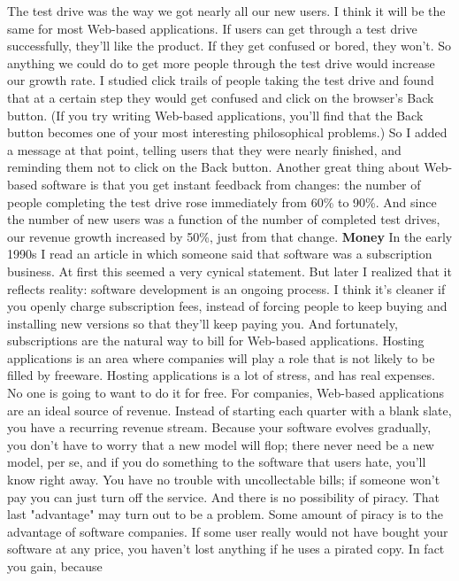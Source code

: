 The test drive was the way we got nearly all our new users.  I
think it will be the same for most Web-based applications.   If
users can get through a test drive successfully, they'll like the
product.  If they get confused or bored, they won't.  So anything
we could do to get more people through the test drive would increase
our growth rate.
I studied click trails of people taking the test drive and found
that at a certain step they would get confused and click on the
browser's Back button.  (If you try writing Web-based applications,
you'll find that the Back button becomes one of your most interesting
philosophical problems.) So I added a message at that point, telling
users that they were nearly finished, and reminding them not to
click on the Back button.  Another great thing about Web-based
software is that you get instant feedback from changes:  the number
of people completing the test drive rose immediately from 60\% to
90\%.  And since the number of new users was a function of the number
of completed test drives, our revenue growth increased by 50\%, just
from that change.
\textbf{Money}
In the early 1990s I read an article in which someone said that
software was a subscription business.  At first this seemed a very
cynical statement.  But later I realized that it reflects reality:
software development is an ongoing process.  I think it's cleaner
if you openly charge subscription fees, instead of forcing people
to keep buying and installing new versions so that they'll keep
paying you.  And fortunately, subscriptions are the natural way to
bill for Web-based applications.
Hosting applications is an area where companies will play a role
that is not likely to be filled by freeware.  Hosting applications
is a lot of stress, and has real expenses.  No one is going to want
to do it for free.
For companies, Web-based applications are an ideal source of revenue.
Instead of starting each quarter with a blank slate, you have a
recurring revenue stream.  Because your software evolves gradually,
you don't have to worry that a new model will flop; there never
need be a new model, per se, and if you do something to the software
that users hate, you'll know right away.  You have no trouble with
uncollectable bills; if someone won't pay you can just turn off
the service.  And there is no possibility of piracy.
That last "advantage" may turn out to be a problem.  Some amount
of piracy is to the advantage of software companies.  If some user
really would not have bought your software at any price, you haven't
lost anything if he uses a pirated copy.  In fact you gain, because
